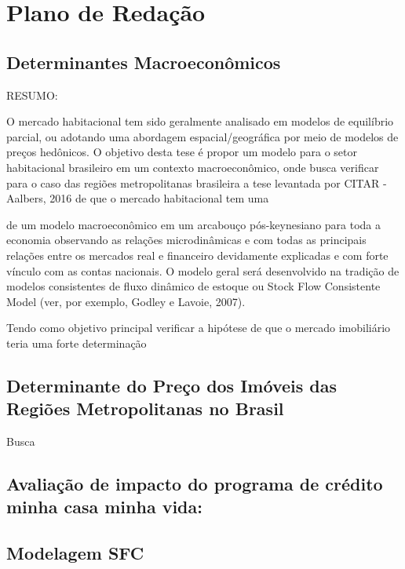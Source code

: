 \section{Plano de Redação}

\subsection{Determinantes Macroeconômicos}

RESUMO:

O mercado habitacional tem sido geralmente analisado em modelos de equilíbrio parcial, ou adotando uma abordagem espacial/geográfica por meio de modelos de preços hedônicos. O objetivo desta tese é propor um modelo para o setor habitacional brasileiro em um contexto macroeconômico, onde busca verificar para o caso das regiões metropolitanas brasileira a tese levantada por CITAR - Aalbers, 2016 de que o mercado habitacional tem uma 

de um modelo macroeconômico em um arcabouço pós-keynesiano para toda a economia observando as relações microdinâmicas e com todas as principais relações entre os mercados real e financeiro devidamente explicadas e com forte vínculo com as contas nacionais. O modelo geral será desenvolvido na tradição de modelos consistentes de fluxo dinâmico de estoque ou Stock Flow Consistente Model (ver, por exemplo, Godley e Lavoie, 2007).

Tendo como objetivo principal verificar a hipótese de que o mercado imobiliário teria uma forte determinação 

\subsection{Determinante do Preço dos Imóveis das Regiões Metropolitanas no Brasil}

Busca 

\subsection{Avaliação de impacto do programa de crédito minha casa minha vida: }

\subsection{Modelagem SFC}